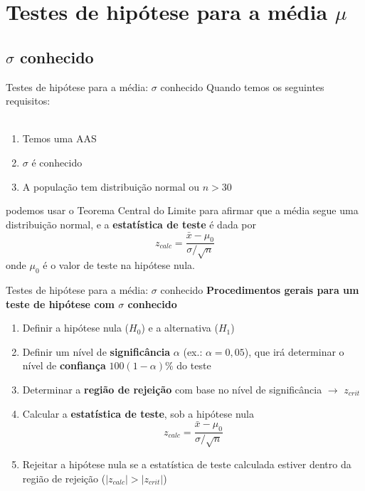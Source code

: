 \documentclass[10pt]{beamer}\usepackage[]{graphicx}\usepackage[]{color}
\theoremstyle{definition}
\begin{document}
\section{Testes de hipótese para a média $\mu$}

\subsection{$\sigma$ conhecido}

\begin{frame}{Testes de hipótese para a média: $\sigma$ conhecido}
  Quando temos os seguintes requisitos: \\~\\
  \begin{enumerate}
  \item Temos uma AAS
  \item $\sigma$ é conhecido
  \item A população tem distribuição normal ou $n>30$
  \end{enumerate}
  \vspace{1em}
  podemos usar o Teorema Central do Limite para afirmar que a média
  segue uma distribuição normal, e a \textbf{estatística de teste} é
  dada por
  \begin{equation*}
    z_{calc} = \frac{\bar{x} - \mu_0}{\sigma/\sqrt{n}}
  \end{equation*}
  onde $\mu_0$ é o valor de teste na hipótese nula.
\end{frame}

\begin{frame}{Testes de hipótese para a média: $\sigma$ conhecido}
  \textbf{Procedimentos gerais para um teste de hipótese com $\sigma$
    conhecido}
\begin{enumerate}
\item Definir a hipótese nula ($H_0$) e a alternativa ($H_1$)
\item Definir um nível de \textbf{significância} $\alpha$ (ex.: $\alpha
  = 0,05$), que irá determinar o nível de \textbf{confiança}
  $100(1-\alpha)\%$ do teste
\item Determinar a \textbf{região de rejeição} com base no nível de
  significância $\rightarrow$ $z_{crit}$
\item Calcular a \textbf{estatística de teste}, sob a hipótese nula
  \begin{equation*}
    z_{calc} = \frac{\bar{x} - \mu_0}{\sigma/\sqrt{n}}
  \end{equation*}
\item Rejeitar a hipótese nula se a estatística de teste calculada
  estiver dentro da região de rejeição ($|z_{calc}| > |z_{crit}|$)
\end{enumerate}
\end{frame}
\end{document}
